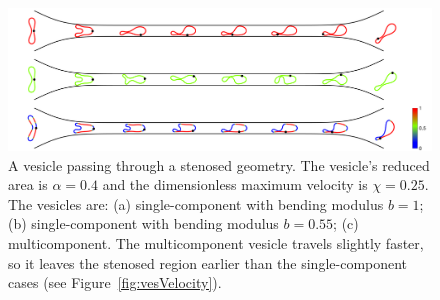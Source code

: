 \documentclass[twoside,twocolumn,9pt]{article}
\newcommand{\subfigimg}[3][,]{%
  \setbox1=\hbox{\texttt{[image: \#3]}}%
  \leavevmode\rlap{\usebox1}%
  \rlap{\hspace*{0pt}\raisebox{\dimexpr\ht1-0\baselineskip}{\bf
  \normalsize #2}}%
  \phantom{\usebox1}%
}
\begin{document}
\begin{figure}[t]
  \centering
  \includegraphics[width=0.9\linewidth]{figures/STENOSIS_RAp4MCp5.pdf}
  \caption{\label{fig:RA4} \small A vesicle passing through a stenosed
  geometry. The vesicle's reduced area is $\alpha = 0.4$ and the
  dimensionless maximum velocity is $\chi = 0.25$. The vesicles are: (a)
  single-component with bending modulus $b=1$; (b) single-component with
  bending modulus $b=0.55$; (c) multicomponent. The multicomponent
  vesicle travels slightly faster, so it leaves the stenosed region
  earlier than the single-component cases (see
  Figure~\ref{fig:vesVelocity}).}
\end{figure}


\end{document}
